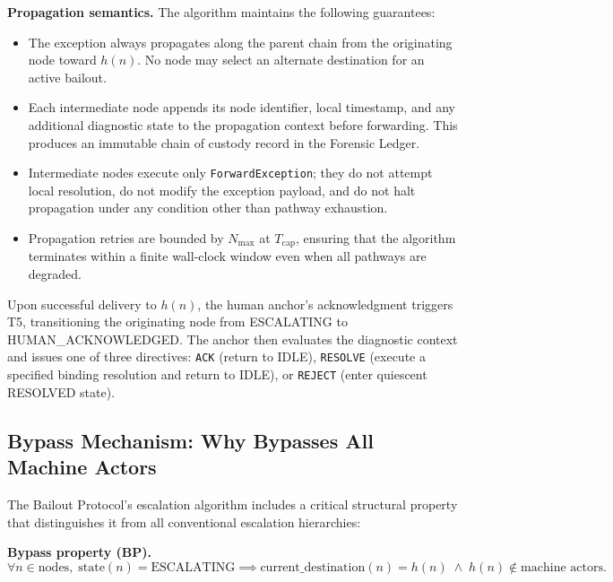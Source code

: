 \bigskip
\noindent\textbf{Propagation semantics.} The algorithm maintains the following guarantees:

\begin{itemize}\itemsep=0pt
\item[\textbf{P1 (Path integrity).}] The exception always propagates along the parent chain from the originating node toward $h(n)$. No node may select an alternate destination for an active bailout.
\item[\textbf{P2 (Context augmentation).}] Each intermediate node appends its node identifier, local timestamp, and any additional diagnostic state to the propagation context before forwarding. This produces an immutable chain of custody record in the Forensic Ledger.
\item[\textbf{P3 (Non-interference).}] Intermediate nodes execute only \texttt{ForwardException}; they do not attempt local resolution, do not modify the exception payload, and do not halt propagation under any condition other than pathway exhaustion.
\item[\textbf{P4 (Bounded retry).}] Propagation retries are bounded by $N_{\max}$ at $T_{\text{cap}}$, ensuring that the algorithm terminates within a finite wall-clock window even when all pathways are degraded.
\end{itemize}

Upon successful delivery to $h(n)$, the human anchor's acknowledgment triggers T5, transitioning the originating node from ESCALATING to HUMAN\_ACKNOWLEDGED. The anchor then evaluates the diagnostic context and issues one of three directives: \texttt{ACK} (return to IDLE), \texttt{RESOLVE} (execute a specified binding resolution and return to IDLE), or \texttt{REJECT} (enter quiescent RESOLVED state).

\subsection{Bypass Mechanism: Why Bypasses All Machine Actors}\label{sec:bypass}

The Bailout Protocol's escalation algorithm includes a critical structural property that distinguishes it from all conventional escalation hierarchies:

\bigskip
\noindent\textbf{Bypass property (BP).}
\begin{equation}
\forall n \in \text{nodes},\; \text{state}(n) = \text{ESCALATING} \implies \text{current\_destination}(n) = h(n) \;\land\; h(n) \notin \text{machine actors}. \tag{BP}
\end{equation}

